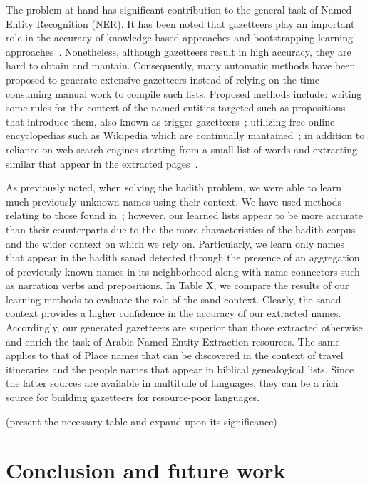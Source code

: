 \documentclass[11pt]{article}
\begin{document}
The problem at hand has significant contribution to the general task of Named Entity Recognition (NER). It has been noted that
gazetteers play an important role in the accuracy of knowledge-based approaches and bootstrapping learning
approaches~\cite{Kozareva:06,Carlson:09,Toral:06,Benajiba:07,Kazama:08,Nadeau:06}. Nonetheless, although gazetteers result in high accuracy,
they are hard to obtain and mantain. %
Consequently, many automatic methods have been proposed to generate extensive gazetteers instead of relying on the time-consuming manual work
to compile such lists. Proposed methods include: writing some rules for the context of the named entities targeted such as propositions that
introduce them, also known as trigger gazetteers~\cite{Kozareva:06,Toral:06}; utilizing free online encyclopedias such as Wikipedia which are 
continually mantained~\cite{Benajiba:07,Kazama:08}; in addition to reliance on web search engines starting from a small list of words and extracting
similar that appear in the extracted pages~\cite{Nadeau:06}.

As previously noted, when solving the hadith problem, we were able to learn much previously unknown names using their context. We have used methods
relating to those found in~\cite{Traboulsi:09,Kozareva:06}; however, our learned lists appear to be more accurate than their counterparts due to the
the more characteristics of the hadith corpus and the wider context on which we rely on. Particularly, we learn only names that appear in the hadith sanad
detected through the presence of an aggregation of previously known names in its neighborhood along with name connectors such as narration verbs and 
prepositions. In Table X, we compare the results of our learning methods to evaluate the role of the sand context. Clearly, the sanad context provides 
a higher confidence in the accuracy of our extracted names. Accordingly, our generated gazetteers are superior than those extracted otherwise and 
enrich the task of Arabic Named Entity Extraction resources. The same applies to that of Place names that can be discovered in the context of travel
itineraries and the people names that appear in biblical genealogical lists. Since the latter sources are available in multitude of languages, they
can be a rich source for building gazetteers for resource-poor languages.

(present the necessary table and expand upon its significance)

\section{Conclusion and future work}
\label{sec:future}
\end{document}
